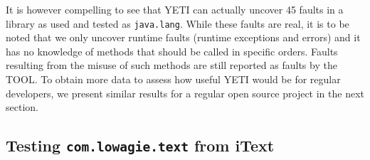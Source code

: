 It is however compelling to see that YETI can actually uncover 45 faults in a library as used and tested as \texttt{java.lang}. 
While these faults are real, it is to be noted that we only uncover runtime faults (runtime exceptions and errors) and it has no knowledge of methods that should be called in specific orders.
Faults resulting from the misuse of such methods are still reported as faults by the TOOL.
To obtain more data to assess how useful YETI would be for regular developers, we present similar results for a regular open source project in the next section.



\subsection{Testing \texttt{com.lowagie.text} from iText}
